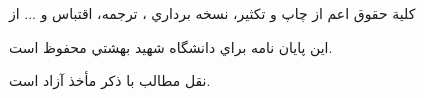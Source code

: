 \ \\ \\ \\ \\ \\ \\ \\
{\XBSols

\vspace*{5 cm}

\centerline{كلية حقوق اعم از چاپ و تكثير، نسخه برداري ، ترجمه، اقتباس و ... از }
\centerline{اين پايان نامه براي دانشگاه شهيد بهشتي محفوظ است.}
\vspace*{1 cm}
\centerline{نقل  مطالب با ذكر مأخذ آزاد است.}
}